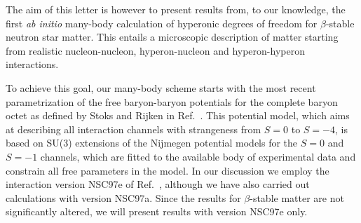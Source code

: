 \begin{multicols}{2}
The aim of this letter is 
however to present results from, to our knowledge,
 the first  {\em ab initio}
many-body calculation of hyperonic degrees of freedom 
for $\beta$-stable neutron star matter. 
This entails a microscopic
description of matter starting from 
realistic nucleon-nucleon, hyperon-nucleon
and hyperon-hyperon interactions. 

To achieve this goal, 
our many-body scheme starts with the most recent 
parametrization
of the free baryon-baryon potentials 
for the complete  baryon octet
as defined by Stoks and Rijken in Ref.\ 
\cite{sr99}. 
This potential model, which aims at describing all 
interaction channels
with strangeness from $S=0$ to $S=-4$, 
is based on SU(3) extensions
of the Nijmegen potential models \cite{rsy98} 
for the $S=0$ and $S=-1$ channels, which
are fitted to the available body of experimental 
data and constrain all free parameters in the model. 
In our discussion we employ 
the interaction version NSC97e of Ref.\ \cite{sr99}, although
we have also carried out calculations with version NSC97a. 
Since the results for $\beta$-stable matter are not significantly altered,
we will present results with version NSC97e only. 


\end{multicols}

